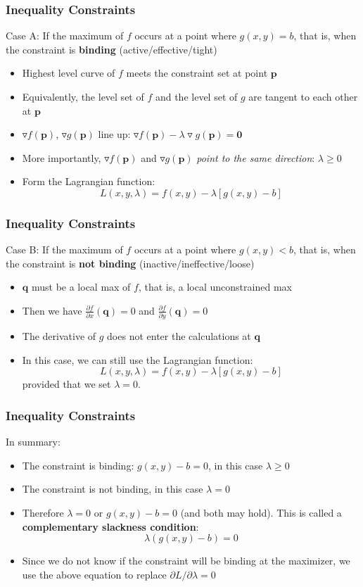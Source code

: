 \documentclass[9pt,aspectratio=169]{beamer}
\begin{document}
\begin{frame}
	\frametitle{Inequality Constraints}
Case A: If the maximum of $f$ occurs at a point where $g(x,y)=b$, that is, when the constraint is \textbf{binding} (active/effective/tight)
	\begin{itemize}
		\item Highest level curve of $f$ meets the constraint set at point $\mathbf{p}$
		\item Equivalently, the level set of $f$ and the level set of $g$ are
        tangent to each other at $\mathbf{p}$
		\item $\triangledown f(\mathbf{p})$, $\triangledown g(\mathbf{p})$
        line up: $\triangledown f(\mathbf{p}) - \lambda \triangledown
        g(\mathbf{p}) = \mathbf{0}$
		\item More importantly, $\triangledown f(\mathbf{p})$ and $\triangledown g(\mathbf{p})$ \emph{point to the same direction}: {\color{red} $\lambda \geq 0 $}
		\item Form the Lagrangian function: $$L(x,y,\lambda) = f(x,y)-\lambda[g(x,y)-b]$$
	\end{itemize}
\end{frame}	

\begin{frame}
	\frametitle{Inequality Constraints}
	Case B: If the maximum of $f$ occurs at a point where $g(x,y)<b$, that is, when the constraint is \textbf{not binding} (inactive/ineffective/loose)
	\begin{itemize} 
		\item $\mathbf{q}$ must be a local max of $f$, that is, a local
        unconstrained max
		\item Then we have $\frac{\partial f}{\partial x}(\mathbf{q}) = 0$
        and $\frac{\partial f}{\partial y}(\mathbf{q}) = 0$
		\item The derivative of $g$ does not enter the calculations at $\mathbf{q}$ 
		\item In this case, we can still use the Lagrangian
        function: $$L(x,y,\lambda) = f(x,y)-\lambda[g(x,y)-b]$$ provided that
        we set {\color{red} $\lambda = 0$}.
	\end{itemize}
\end{frame}	

\begin{frame}
	\frametitle{Inequality Constraints}
In summary:
	\begin{itemize} 
		\item The constraint is binding: $g(x,y)-b = 0$, in this case $\lambda \geq 0$
		\item The constraint is not binding, in this case $\lambda = 0$
		\item Therefore $\lambda=0$ or $g(x,y)-b=0$ (and both may hold). This
        is called a \textbf{complementary slackness condition}:
        $$\lambda(g(x,y)-b) = 0$$
		\item Since we do not know if the constraint will be binding at the
        maximizer, we use the above equation to replace $\partial L/\partial
        \lambda = 0$
	\end{itemize}
\end{frame}	
\end{document}
